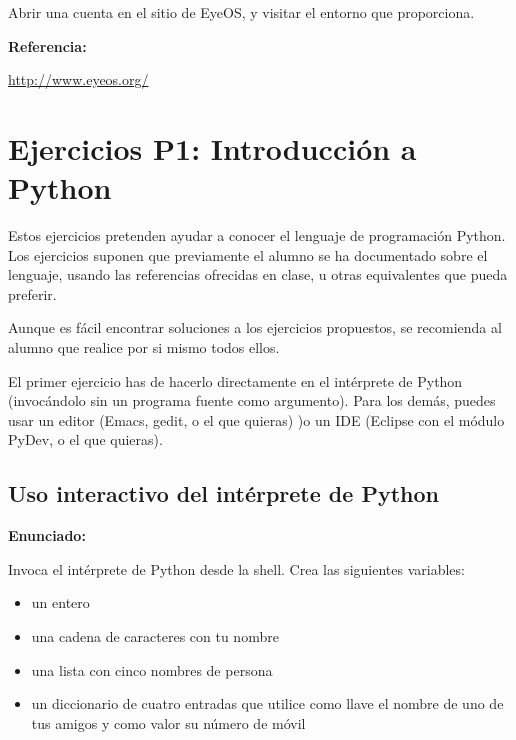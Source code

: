 Abrir una cuenta en el sitio de EyeOS, y visitar el entorno que proporciona.

\textbf{Referencia:}

\url{http://www.eyeos.org/}

\section{Ejercicios P1: Introducción a Python}

Estos ejercicios pretenden ayudar a conocer el lenguaje de programación Python. Los ejercicios suponen que previamente el alumno se ha documentado sobre el lenguaje, usando las referencias ofrecidas en clase, u otras equivalentes que pueda preferir.

Aunque es fácil encontrar soluciones a los ejercicios propuestos, se recomienda al alumno que realice por si mismo todos ellos.

El primer ejercicio has de hacerlo directamente en el intérprete de Python (invocándolo sin un  programa fuente como argumento). Para los demás, puedes usar un editor (Emacs, gedit, o el que quieras) )o un IDE (Eclipse con el módulo PyDev, o el que quieras).

\subsection{Uso interactivo del intérprete de Python}
\label{subsec:practicas-interprete}

\textbf{Enunciado:}

Invoca el intérprete de Python desde la shell. Crea las siguientes
variables:

\begin{itemize}
\item un entero
\item una cadena de caracteres con tu nombre
\item una lista con cinco nombres de persona
\item un diccionario de cuatro
entradas que utilice como llave el nombre de uno de tus amigos y como valor su
número de móvil
\end{itemize}

